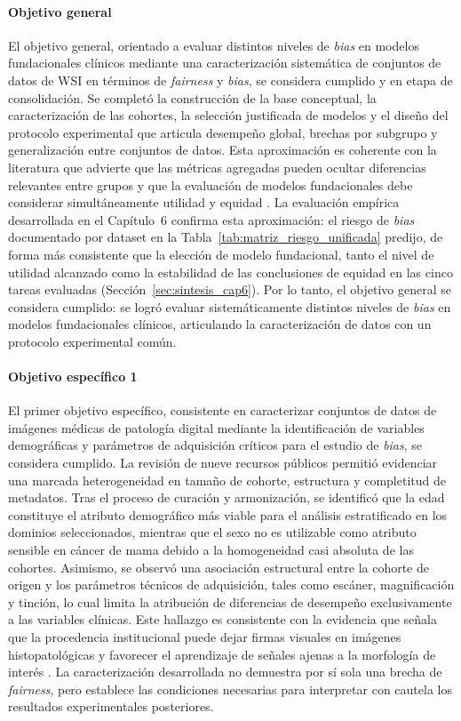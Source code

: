 \paragraph{Objetivo general} El objetivo general, orientado a evaluar distintos niveles de \textit{bias} en modelos fundacionales clínicos mediante una caracterización sistemática de conjuntos de datos de WSI en términos de \textit{fairness} y \textit{bias}, se considera cumplido y en etapa de consolidación. Se completó la construcción de la base conceptual, la caracterización de las cohortes, la selección justificada de modelos y el diseño del protocolo experimental que articula desempeño global, brechas por subgrupo y generalización entre conjuntos de datos. Esta aproximación es coherente con la literatura que advierte que las métricas agregadas pueden ocultar diferencias relevantes entre grupos y que la evaluación de modelos fundacionales debe considerar simultáneamente utilidad y equidad \parencite{NEURIPS2024_c9826b9e}. La evaluación empírica desarrollada en el Capítulo~6 confirma esta aproximación: el riesgo de \textit{bias} documentado por dataset en la Tabla~\ref{tab:matriz_riesgo_unificada} predijo, de forma más consistente que la elección de modelo fundacional, tanto el nivel de utilidad alcanzado como la estabilidad de las conclusiones de equidad en las cinco tareas evaluadas (Sección~\ref{sec:sintesis_cap6}). Por lo tanto, el objetivo general se considera cumplido: se logró evaluar sistemáticamente distintos niveles de \textit{bias} en modelos fundacionales clínicos, articulando la caracterización de datos con un protocolo experimental común.

\paragraph{Objetivo específico 1} El primer objetivo específico, consistente en caracterizar conjuntos de datos de imágenes médicas de patología digital mediante la identificación de variables demográficas y parámetros de adquisición críticos para el estudio de \textit{bias}, se considera cumplido. La revisión de nueve recursos públicos permitió evidenciar una marcada heterogeneidad en tamaño de cohorte, estructura y completitud de metadatos. Tras el proceso de curación y armonización, se identificó que la edad constituye el atributo demográfico más viable para el análisis estratificado en los dominios seleccionados, mientras que el sexo no es utilizable como atributo sensible en cáncer de mama debido a la homogeneidad casi absoluta de las cohortes. Asimismo, se observó una asociación estructural entre la cohorte de origen y los parámetros técnicos de adquisición, tales como escáner, magnificación y tinción, lo cual limita la atribución de diferencias de desempeño exclusivamente a las variables clínicas. Este hallazgo es consistente con la evidencia que señala que la procedencia institucional puede dejar firmas visuales en imágenes histopatológicas y favorecer el aprendizaje de señales ajenas a la morfología de interés \parencite{alsaafin2023biased,howard2021site}. La caracterización desarrollada no demuestra por sí sola una brecha de \textit{fairness}, pero establece las condiciones necesarias para interpretar con cautela los resultados experimentales posteriores.

